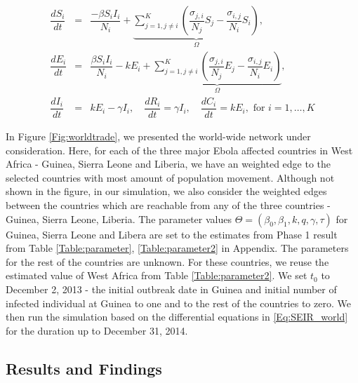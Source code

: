 \documentclass[10pt, journal,onecolumn]{IEEEtran}
\begin{document}
\begin{eqnarray}
\dfrac{dS_{i}}{dt}&=&\dfrac{-\beta S_{i}I_{i}}{N_{i}}+\underset{\Omega}{\underbrace{\sum_{j=1,j\neq i}^{K}\left(\dfrac{\sigma_{j,i}}{N_{j}}S_{j}-\dfrac{\sigma_{i,j}}{N_{i}}S_{i}\right)}},\nonumber \\
\dfrac{dE_{i}}{dt}&=&\dfrac{\beta S_{i}I_{i}}{N_{i}}-kE_{i}+\underset{\Omega}{\underbrace{\sum_{j=1,j\neq i}^{K}\left(\dfrac{\sigma_{j,i}}{N_{j}}E_{j}-\dfrac{\sigma_{i,j}}{N_{i}}E_{i}\right)}},\nonumber \\
\dfrac{dI_{i}}{dt}&=& kE_{i}-\gamma I_{i},
\quad
\dfrac{dR_i}{dt}	=	\gamma I_i,
\quad
\dfrac{dC_i}{dt}	=	kE_i, \text{  for } i=1,\ldots, K
\label{Eq:SEIR_world}
\end{eqnarray}

In Figure \ref{Fig:worldtrade}, we presented the world-wide network under consideration. Here, for
each of the three major Ebola affected countries in West Africa - Guinea, Sierra Leone and Liberia,
we have an weighted edge to the selected countries with most amount of population movement. Although
not shown in the figure, in our simulation, we also consider the weighted edges between the
countries which are reachable from any of the three countries -  Guinea, Sierra Leone,  Liberia.
The parameter values $\Theta=(\beta_0,\beta_1,k,q,\gamma, \tau)$ for Guinea, Sierra Leone and Libera
are set to the estimates from Phase 1 result from Table \ref{Table:parameter},
\ref{Table:parameter2} in Appendix. The parameters for the rest of the countries are unknown. For
these countries, we reuse the estimated value of West Africa from Table \ref{Table:parameter2}. We
set $t_0$ to December 2, 2013 - the initial outbreak date in Guinea and initial number of infected
individual at Guinea to one and to the rest of the countries to zero. We then run the simulation
based on the differential equations in \eqref{Eq:SEIR_world} for the duration up to December 31,
2014.

\subsection{Results and Findings}
\label{SubSec:WorldResult}
\end{document}
